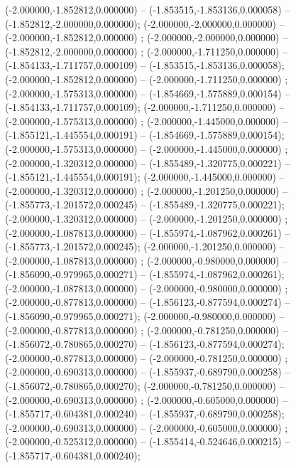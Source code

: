  (-2.000000,-1.852812,0.000000) -- (-1.853515,-1.853136,0.000058) -- (-1.852812,-2.000000,0.000000);
 (-2.000000,-2.000000,0.000000) -- (-2.000000,-1.852812,0.000000) ;
 (-2.000000,-2.000000,0.000000) -- (-1.852812,-2.000000,0.000000) ;
 (-2.000000,-1.711250,0.000000) -- (-1.854133,-1.711757,0.000109) -- (-1.853515,-1.853136,0.000058);
 (-2.000000,-1.852812,0.000000) -- (-2.000000,-1.711250,0.000000) ;
 (-2.000000,-1.575313,0.000000) -- (-1.854669,-1.575889,0.000154) -- (-1.854133,-1.711757,0.000109);
 (-2.000000,-1.711250,0.000000) -- (-2.000000,-1.575313,0.000000) ;
 (-2.000000,-1.445000,0.000000) -- (-1.855121,-1.445554,0.000191) -- (-1.854669,-1.575889,0.000154);
 (-2.000000,-1.575313,0.000000) -- (-2.000000,-1.445000,0.000000) ;
 (-2.000000,-1.320312,0.000000) -- (-1.855489,-1.320775,0.000221) -- (-1.855121,-1.445554,0.000191);
 (-2.000000,-1.445000,0.000000) -- (-2.000000,-1.320312,0.000000) ;
 (-2.000000,-1.201250,0.000000) -- (-1.855773,-1.201572,0.000245) -- (-1.855489,-1.320775,0.000221);
 (-2.000000,-1.320312,0.000000) -- (-2.000000,-1.201250,0.000000) ;
 (-2.000000,-1.087813,0.000000) -- (-1.855974,-1.087962,0.000261) -- (-1.855773,-1.201572,0.000245);
 (-2.000000,-1.201250,0.000000) -- (-2.000000,-1.087813,0.000000) ;
 (-2.000000,-0.980000,0.000000) -- (-1.856090,-0.979965,0.000271) -- (-1.855974,-1.087962,0.000261);
 (-2.000000,-1.087813,0.000000) -- (-2.000000,-0.980000,0.000000) ;
 (-2.000000,-0.877813,0.000000) -- (-1.856123,-0.877594,0.000274) -- (-1.856090,-0.979965,0.000271);
 (-2.000000,-0.980000,0.000000) -- (-2.000000,-0.877813,0.000000) ;
 (-2.000000,-0.781250,0.000000) -- (-1.856072,-0.780865,0.000270) -- (-1.856123,-0.877594,0.000274);
 (-2.000000,-0.877813,0.000000) -- (-2.000000,-0.781250,0.000000) ;
 (-2.000000,-0.690313,0.000000) -- (-1.855937,-0.689790,0.000258) -- (-1.856072,-0.780865,0.000270);
 (-2.000000,-0.781250,0.000000) -- (-2.000000,-0.690313,0.000000) ;
 (-2.000000,-0.605000,0.000000) -- (-1.855717,-0.604381,0.000240) -- (-1.855937,-0.689790,0.000258);
 (-2.000000,-0.690313,0.000000) -- (-2.000000,-0.605000,0.000000) ;
 (-2.000000,-0.525312,0.000000) -- (-1.855414,-0.524646,0.000215) -- (-1.855717,-0.604381,0.000240);
